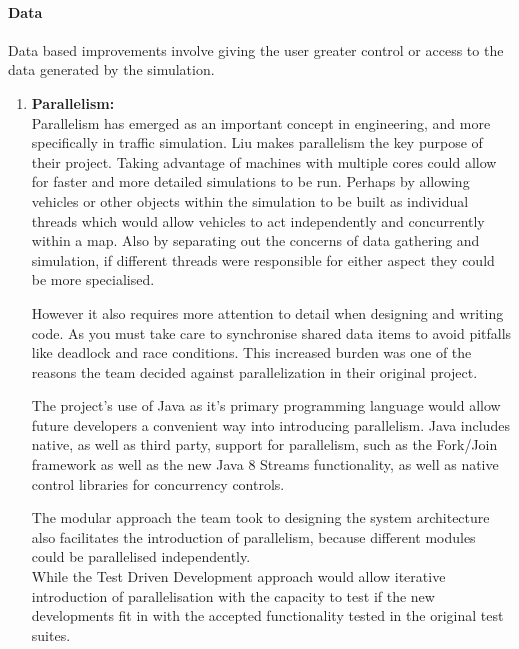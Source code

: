 \documentclass[11pt]{article}
\begin{document}
{\begin{enumerate}
\paragraph{Data}
Data based improvements involve giving the user greater control or access to the data generated by the simulation.\\

\begin{enumerate}
	
	\item \textbf{Parallelism:}
	\\
	
	Parallelism has emerged as an important concept in engineering, and more specifically in traffic simulation. Liu \cite{website:phy-ntnu-traffic-simulation} makes parallelism the key purpose of their project. Taking advantage of machines with multiple cores could allow for faster and more detailed simulations to be run. Perhaps by allowing vehicles or other objects within the simulation to be built as individual threads which would allow vehicles to act independently and concurrently within a map. Also by separating out the concerns of data gathering and simulation, if different threads were responsible for either aspect they could be more specialised.
	
	However it also requires more attention to detail when designing and writing code. As you must take care to synchronise shared data items to avoid pitfalls like deadlock and race conditions. This increased burden was one of the reasons the team decided against parallelization in their original project.
	
	The project's use of Java as it's primary programming language would allow future developers a convenient way into introducing parallelism. Java includes native, as well as third party, support for parallelism, such as the Fork/Join framework\cite{LeaForkJoin} as well as the new Java 8 Streams functionality\cite{website:Oracle-Java-8}, as well as native control libraries for concurrency controls.
	
	The modular approach the team took to designing the system architecture also facilitates the introduction of parallelism, because different modules could be parallelised independently.
	\\While the Test Driven Development approach would allow iterative introduction of parallelisation with the capacity to test if the new developments fit in with the accepted functionality tested in the original test suites.\\
	

\end{enumerate}
\end{enumerate}}
\end{document}
